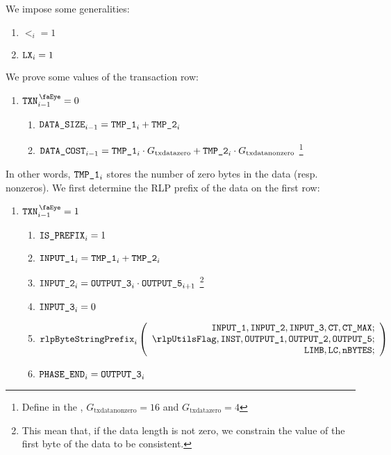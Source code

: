\begin{center}
\end{center}
We impose some generalities:
\begin{enumerate}
	\item $\lt_{i}=1$
	\item $\texttt{LX}_{i}=1$
\end{enumerate}
We prove some values of the transaction row:
\begin{enumerate}[resume]
	\item \If $\isTxn_{i-1}=0$ \Then
		\begin{enumerate}
			\item $\texttt{DATA\_SIZE}_{i-1} = \texttt{TMP\_1}_{i} + \texttt{TMP\_2}_{i}$
			\item $\texttt{DATA\_COST}_{i-1} = \texttt{TMP\_1}_{i} \cdot G_{\mathrm{txdatazero}} + \texttt{TMP\_2}_{i} \cdot G_{\mathrm{txdatanonzero}}$ 
				\footnote{Define in the \cite{EYP-London}, $G_{\mathrm{txdatanonzero}}=16$ and $G_{\mathrm{txdatazero}}=4$}
		\end{enumerate}
\end{enumerate}
In other words, $\texttt{TMP\_1}_{i}$ stores the number of zero bytes in the data (resp. nonzeros). 
\newline
We first determine the RLP prefix of the data on the first row:
\begin{enumerate}[resume]
	\item \If $\isTxn_{i-1}=1$ \Then
		\begin{enumerate}
			\item $\texttt{IS\_PREFIX}_{i} = 1$
			\item $\texttt{INPUT\_1}_{i} = \texttt{TMP\_1}_{i} + \texttt{TMP\_2}_{i}$
			\item $\texttt{INPUT\_2}_{i} = \texttt{OUTPUT\_3}_{i} \cdot \texttt{OUTPUT\_5}_{i+1}$
				\footnote{This mean that, if the data length is not zero, we constrain the value of the first byte of the data to be consistent.}
			\item $\texttt{INPUT\_3}_{i} = 0$ 
			\item 
				\[
					\rlpBytestringPrefix_{i}
					\left(
					\begin{array}{r}
						\inputColumn{1},
						\inputColumn{2},
						\inputColumn{3},
						\ct,
						\maxCt; \\
						\rlpUtilsFlag,
						\INST,
						\resultColumn{1},
						\resultColumn{2},
						\resultColumn{5}; \\
						\limb,
						\lc,
						\limbsize; \\
					\end{array}
					\right)
				\]
			\item $\texttt{PHASE\_END}_{i} = \texttt{OUTPUT\_3}_{i}$
		\end{enumerate}
\end{enumerate}

